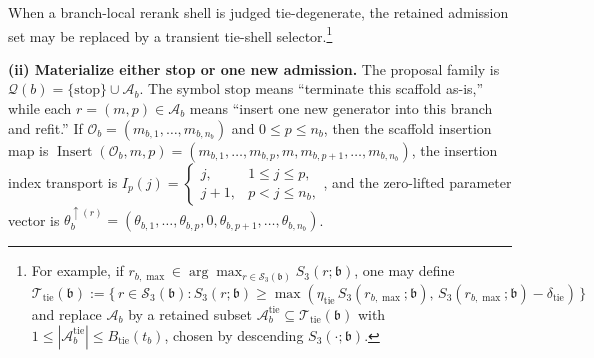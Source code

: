 \documentclass[11pt]{article}
\begin{document}
When a branch-local rerank shell is judged tie-degenerate, the retained admission set may be replaced by a transient tie-shell selector.\footnote{For example, if \(r_{b,\max}\in\arg\max_{r\in\mathcal S_3(\mathfrak b)}S_3(r;\mathfrak b)\), one may define \(\mathcal T_{\mathrm{tie}}(\mathfrak b):=\{\,r\in\mathcal S_3(\mathfrak b): S_3(r;\mathfrak b)\ge \max(\eta_{\mathrm{tie}}\,S_3(r_{b,\max};\mathfrak b),\,S_3(r_{b,\max};\mathfrak b)-\delta_{\mathrm{tie}})\,\}\) and replace \(\mathcal A_b\) by a retained subset \(\mathcal A_b^{\mathrm{tie}}\subseteq \mathcal T_{\mathrm{tie}}(\mathfrak b)\) with \(1\le |\mathcal A_b^{\mathrm{tie}}|\le B_{\mathrm{tie}}(t_b)\), chosen by descending \(S_3(\cdot;\mathfrak b)\).}


\textbf{(ii) Materialize either stop or one new admission.}
The proposal family is \(\mathcal Q(b)=\{\mathrm{stop}\}\cup\mathcal A_b\). The symbol \(\mathrm{stop}\) means ``terminate this scaffold as-is,'' while each \(r=(m,p)\in\mathcal A_b\) means ``insert one new generator into this branch and refit.'' If \(\mathcal O_b=(m_{b,1},\dots,m_{b,n_b})\) and \(0\le p\le n_b\), then the scaffold insertion map is \(\operatorname{Insert}(\mathcal O_b,m,p)=(m_{b,1},\dots,m_{b,p},m,m_{b,p+1},\dots,m_{b,n_b})\), the insertion index transport is \(I_p(j)=\begin{cases} j,&1\le j\le p,\\ j+1,&p<j\le n_b, \end{cases}\), and the zero-lifted parameter vector is \(\theta_b^{\uparrow(r)}=(\theta_{b,1},\dots,\theta_{b,p},0,\theta_{b,p+1},\dots,\theta_{b,n_b})\).
\end{document}
